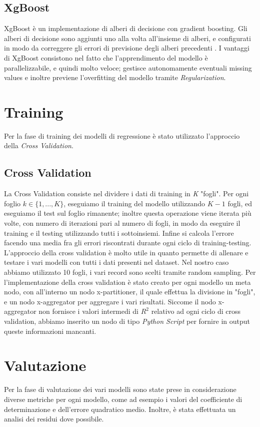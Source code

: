 \documentclass[12pt, a4paper, twocolumn]{article} %
\begin{document}
\subsection{XgBoost}
XgBoost è un implementazione di alberi di decisione con gradient boosting. Gli alberi di decisione sono aggiunti uno alla volta all'insieme di alberi, e configurati in modo da correggere gli errori di previsione degli alberi precedenti \cite{xgboost}. I vantaggi di XgBoost consistono nel fatto che l'apprendimento del modello è parallelizzabile, e quindi molto veloce; gestisce autonomamente eventuali missing values e inoltre previene l'overfitting del modello tramite \textit{Regularization}.



\section{Training}
Per la fase di training dei modelli di regressione è stato utilizzato l'approccio della \textit{Cross Validation}.

\subsection{Cross Validation}
La Cross Validation consiste nel dividere i dati di training in \textit{K} "fogli". Per ogni foglio $k \in \lbrace1,..., K\rbrace$, eseguiamo il training del modello utilizzando $K-1$ fogli, ed eseguiamo il test sul foglio rimanente; inoltre questa operazione viene iterata più volte, con numero di iterazioni pari al numero di fogli, in modo da eseguire il training e il testing utilizzando tutti i sottoinsiemi. Infine si calcola l'errore facendo una media fra gli errori riscontrati durante ogni ciclo di training-testing. \cite{mlbook} %
L'approccio della cross validation è molto utile in quanto permette di allenare e testare i vari modelli con tutti i dati presenti nel dataset.
Nel nostro caso abbiamo utilizzato 10 fogli, i vari record sono scelti tramite random sampling. Per l'implementazione della cross validation è stato creato per ogni modello un meta nodo, con all'interno un nodo x-partitioner, il quale effettua la divisione in "fogli", e un nodo x-aggregator per aggregare i vari risultati. Siccome il nodo x-aggregator non fornisce i valori intermedi di $R^{2}$ relativo ad ogni ciclo di cross validation, abbiamo inserito un nodo di tipo \textit{Python Script} per fornire in output queste informazioni mancanti.

\section{Valutazione}
Per la fase di valutazione dei vari modelli sono state prese in considerazione diverse metriche per ogni modello, come ad esempio i valori del coefficiente di determinazione e dell'errore quadratico medio. Inoltre, è stata effettuata un analisi dei residui dove possibile.
\end{document}
